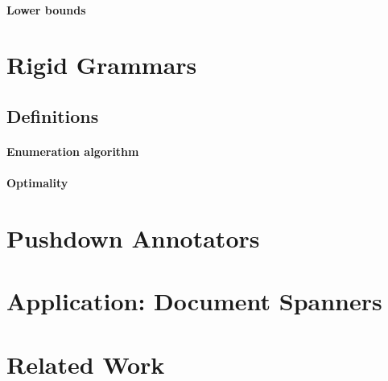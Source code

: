 \documentclass[pdftex]{pucthesis}	%
\begin{document}
\paragraph{Lower bounds}


\section{Rigid Grammars} \label{gram:sec:quadratic}


\subsection{Definitions}
\label{gram:sec:profile}


\paragraph{Enumeration algorithm}


\paragraph{Optimality}


\section{Pushdown Annotators} \label{gram:sec:linear}



\section{Application: Document Spanners} \label{gram:sec:spanners}

 
 
 \section{Related Work}\label{gram:sec:relwork}
 

\end{document}
